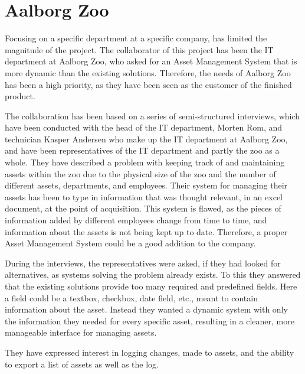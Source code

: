 \section{Aalborg Zoo}\label{ch:problemdefinition}
Focusing on a specific department at a specific company, has limited the magnitude of the project. The collaborator of this project has been the IT department at Aalborg Zoo, who asked for an Asset Management System that is more dynamic than the existing solutions. Therefore, the needs of Aalborg Zoo has been a high priority, as they have been seen as the customer of the finished product.
\par
The collaboration has been based on a series of semi-structured interviews, which have been conducted with the head of the IT department, Morten Rom, and technician Kasper Andersen who make up the IT department at Aalborg Zoo, and have been representatives of the IT department and partly the zoo as a whole. They have described a problem with keeping track of and maintaining assets within the zoo due to the physical size of the zoo and the number of different assets, departments, and employees. Their system for managing their assets has been to type in information that was thought relevant, in an excel document, at the point of acquisition. This system is flawed, as the pieces of information added by different employees change from time to time, and information about the assets is not being kept up to date. Therefore, a proper Asset Management System could be a good addition to the company.
\par
During the interviews, the representatives were asked, if they had looked for alternatives, as systems solving the problem already exists. To this they answered that the existing solutions provide too many required and predefined fields. Here a field could be a textbox, checkbox, date field, etc., meant to contain information about the asset. Instead they wanted a dynamic system with only the information they needed for every specific asset, resulting in a cleaner, more manageable interface for managing assets.
\par
They have expressed interest in logging changes, made to assets, and the ability to export a list of assets as well as the log. 





